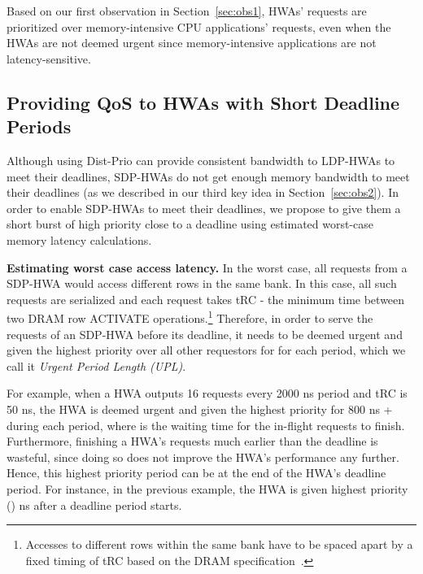 \documentclass[10pt,letterpaper]{article}
\newcommand{\kevin}[1]{}
\begin{document}
Based on our first observation in Section~\ref{sec:obs1},
HWAs' requests are prioritized over memory-intensive CPU
applications' requests, even when the HWAs are not deemed urgent
since memory-intensive applications are not latency-sensitive.

\subsection{Providing QoS to HWAs with Short Deadline Periods}
\label{sec:shortdeadline}

Although using Dist-Prio can provide consistent bandwidth to LDP-HWAs
to meet their deadlines, SDP-HWAs do not get enough memory bandwidth to meet
their deadlines (as we described in our third key idea in
Section~\ref{sec:obs2}). In order to enable SDP-HWAs to meet their deadlines, we
propose to give them a short burst of high priority close to a deadline using
estimated worst-case memory latency calculations.

\kevin{Links back to my previous comment on using Dist-Prio for SDP? Isn't this
scheme essentially changing the emergency condition based on the worst-case mem
latency?}



\noindent\textbf{Estimating worst case access latency.} In the worst case, all
requests from a SDP-HWA would access different rows in the same bank. In this
case, all such requests are serialized and each request takes tRC - the minimum
time between two DRAM row ACTIVATE operations.\footnote{Accesses to different
rows within the same bank have to be spaced apart by a fixed timing of tRC based
on the DRAM specification~\cite{jedec-ddr3}.} Therefore, in order to serve the
requests of an SDP-HWA before its deadline, it needs to be deemed urgent and
given the highest priority over all other requestors for 
for each period, which we call it \emph{Urgent Period Length (UPL)}.

For example, when a HWA outputs 16 requests every 2000 ns period and tRC is 50
ns, the HWA is deemed urgent and given the highest priority for 800 ns +
 during each period, where  is the waiting time for the
in-flight requests to finish. Furthermore, finishing a HWA's requests much
earlier than the deadline is wasteful, since doing so does not improve the HWA's
performance any further. Hence, this highest priority period can be at the end
of the HWA's deadline period. For instance, in the previous example, the HWA is
given highest priority () ns after a deadline period starts.
\end{document}
